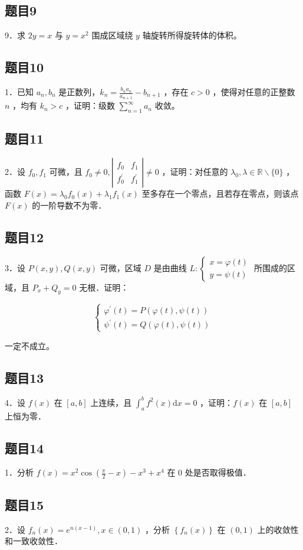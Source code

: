 \documentclass{article}
\begin{document}
\subsection{题目9}
9．求 \(2 y=x\) 与 \(y=x^{2}\) 围成区域绕 \(y\) 轴旋转所得旋转体的体积。

\subsection{题目10}
1．已知 \(a_{n}, b_{n}\) 是正数列，\(k_{n}=\frac{b_{n} a_{n}}{a_{n+1}}-b_{n+1}\) ，存在 \(c>0\) ，使得对任意的正整数 \(n\) ，均有 \(k_{n}>c\) ，证明：级数 \(\sum_{n=1}^{\infty} a_{n}\) 收敛。

\subsection{题目11}
2．设 \(f_{0}, f_{1}\) 可微，且 \(f_{0} \neq 0,\left|\begin{array}{ll}f_{0} & f_{1} \\ f_{0}^{\prime} & f_{1}^{\prime}\end{array}\right| \neq 0\) ，证明：对任意的 \(\lambda_{0}, \lambda \in \mathbb{R} \backslash\{0\}\) ，函数 \(F(x)=\lambda_{0} f_{0}(x)+ \lambda_{1} f_{1}(x)\) 至多存在一个零点，且若存在零点，则该点 \(F(x)\) 的一阶导数不为零．

\subsection{题目12}
3．设 \(P(x, y), Q(x, y)\) 可微，区域 \(D\) 是由曲线 \(L:\left\{\begin{array}{l}x=\varphi(t) \\ y=\psi(t)\end{array}\right.\) 所围成的区域，且 \(P_{x}+Q_{y}=0\) 无根．证明：

\[
\left\{\begin{array}{l}
\varphi^{\prime}(t)=P(\varphi(t), \psi(t)) \\
\psi^{\prime}(t)=Q(\varphi(t), \psi(t))
\end{array}\right.
\]

一定不成立。

\subsection{题目13}
4．设 \(f(x)\) 在 \([a, b]\) 上连续，且 \(\int_{a}^{b} f^{2}(x) \mathrm{d} x=0\) ，证明：\(f(x)\) 在 \([a, b]\) 上恒为零．

\subsection{题目14}
1．分析 \(f(x)=x^{2} \cos \left(\frac{\pi}{2}-x\right)-x^{3}+x^{4}\) 在 0 处是否取得极值．

\subsection{题目15}
2．设 \(f_{n}(x)=e^{n(x-1)}, x \in(0,1)\) ，分析 \(\left\{f_{n}(x)\right\}\) 在 \((0,1)\) 上的收敛性和一致收敛性．
\end{document}

